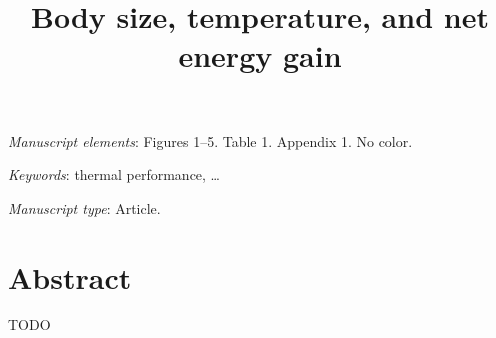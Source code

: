 \documentclass[11pt]{article}
\begin{document}


\title{Body size, temperature, and net energy gain}


\date{}

\maketitle

\bigskip

\noindent
\textit{Manuscript elements}:
Figures 1--5.
Table 1.
Appendix 1. %
No color.

\bigskip

\noindent
\textit{Keywords}: 
thermal performance, \ldots

\bigskip

\noindent
\textit{Manuscript type}:
Article.

\vfill


\newpage


\linenumbers{}

\section*{Abstract}

TODO

\newpage

\end{document}
